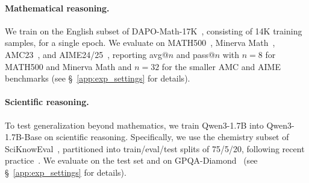 \documentclass{article}
\begin{document}
\paragraph{Mathematical reasoning.} We train on the English subset of DAPO-Math-17K~\citep{yu2025dapo}, consisting of 14K training samples, for a single epoch.  We evaluate on MATH500~\citep{hendrycks2021math, lightman2024let}, Minerva Math~\citep{lewkowycz2022solving}, AMC23~\citep{maa_amc}, and AIME24/25~\citep{maa_aime}, reporting avg@$n$ and pass@$n$ with $n{=}8$ for MATH500 and Minerva Math and $n{=}32$ for the smaller AMC and AIME benchmarks (see \S~\ref{app:exp_settings} for details).

\paragraph{Scientific reasoning.} To test generalization beyond mathematics, we train Qwen3-1.7B into Qwen3-1.7B-Base on scientific reasoning. Specifically, we use the chemistry subset of SciKnowEval~\citep{feng2024sciknoweval}, partitioned into train/eval/test splits of 75/5/20, following recent practice~\citep{kim2026does, hubotter2026sdpo, zhang2026illusion, shenfeld2026selfdistill}. We evaluate on the test set and on GPQA-Diamond~\citep{rein2024gpqa} (see \S~\ref{app:exp_settings} for details).
\end{document}
